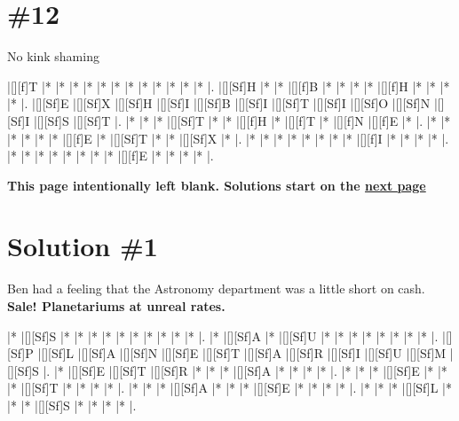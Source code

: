 \documentclass[letterpaper]{article}
\begin{document}
\section*{\#12}
No kink shaming

\vspace*{1em}
\begin{Puzzle}{13}{7}
|[][f]T   |*        |*        |*        |*        |*        |*        |*        |*        |*        |*        |*        |*        |.
|[][Sf]H  |*        |*        |[][f]B   |*        |*        |*        |*        |[][f]H   |*        |*        |*        |*        |.
|[][Sf]E  |[][Sf]X  |[][Sf]H  |[][Sf]I  |[][Sf]B  |[][Sf]I  |[][Sf]T  |[][Sf]I  |[][Sf]O  |[][Sf]N  |[][Sf]I  |[][Sf]S  |[][Sf]T  |.
|*        |*        |*        |[][Sf]T  |*        |*        |[][f]H   |*        |[][f]T   |*        |[][f]N   |[][f]E   |*        |.
|*        |*        |*        |*        |*        |*        |[][f]E   |*        |[][Sf]T  |*        |*        |[][Sf]X  |*        |.
|*        |*        |*        |*        |*        |*        |*        |*        |[][f]I   |*        |*        |*        |*        |.
|*        |*        |*        |*        |*        |*        |*        |*        |[][f]E   |*        |*        |*        |*        |.
\end{Puzzle}

\newpage
\begin{center}
\textbf{This page intentionally left blank. Solutions start on the \hyperlink{solstart}{next page}}
\end{center}

\newpage

\hypertarget{solstart}{}
\section*{Solution \#1}
Ben had a feeling that the Astronomy department was a little short on cash.
\newline\textbf{Sale! Planetariums at unreal rates.}

\vspace*{1em}
\begin{Puzzle}{12}{8}
|*        |[][Sf]S  |*        |*        |*        |*        |*        |*        |*        |*        |*        |*        |.
|*        |[][Sf]A  |*        |[][Sf]U  |*        |*        |*        |*        |*        |*        |*        |*        |.
|[][Sf]P  |[][Sf]L  |[][Sf]A  |[][Sf]N  |[][Sf]E  |[][Sf]T  |[][Sf]A  |[][Sf]R  |[][Sf]I  |[][Sf]U  |[][Sf]M  |[][Sf]S  |.
|*        |[][Sf]E  |[][Sf]T  |[][Sf]R  |*        |*        |*        |[][Sf]A  |*        |*        |*        |*        |.
|*        |*        |*        |[][Sf]E  |*        |*        |*        |[][Sf]T  |*        |*        |*        |*        |.
|*        |*        |*        |[][Sf]A  |*        |*        |*        |[][Sf]E  |*        |*        |*        |*        |.
|*        |*        |*        |[][Sf]L  |*        |*        |*        |[][Sf]S  |*        |*        |*        |*        |.
\end{Puzzle}
\end{document}
